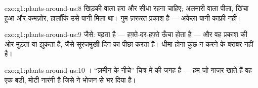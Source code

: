 \begin{solution}{exo:g1:plants-around-us:8}
खिड़की वाला  हरा और सीधा रहना चाहिए; अलमारी वाला  पीला, खिंचा
हुआ और कमज़ोर, हालाँकि उसे पानी मिला था। गुम ज़रूरत प्रकाश है ---
अकेला पानी काफ़ी नहीं।
\end{solution}

\begin{solution}{exo:g1:plants-around-us:9}
जैसे:  बढ़ता है --- हफ़्ते-दर-हफ़्ते ऊँचा होता है --- और वह
प्रकाश की ओर मुड़ता या झुकता है, जैसे सूरजमुखी दिन का पीछा करता है।
धीमा होना कुछ न करने के बराबर नहीं है।
\end{solution}

\begin{solution}{exo:g1:plants-around-us:10}
। ``ज़मीन के नीचे'' चित्र में  की जगह है --- हम जो गाजर खाते
हैं वह एक बड़ी, मोटी नारंगी  है जिसे  ने भोजन से भर दिया है।
\end{solution}
